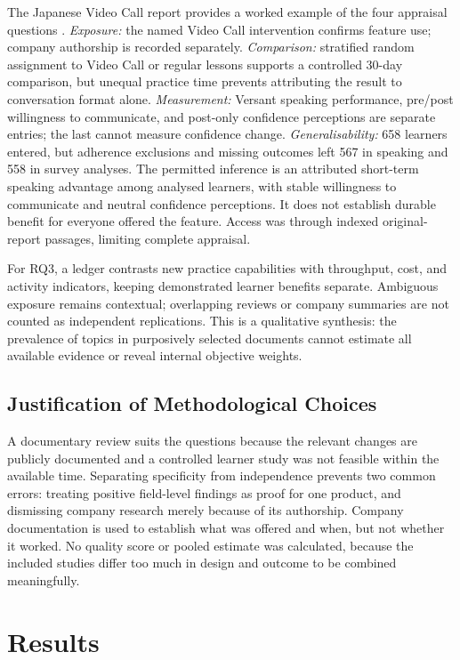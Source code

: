 \documentclass[11pt,titlepage]{article}
\begin{document}
The Japanese Video Call report provides a worked example of the four appraisal questions \parencite{kittredge2025video}. \emph{Exposure:} the named Video Call intervention confirms feature use; company authorship is recorded separately. \emph{Comparison:} stratified random assignment to Video Call or regular lessons supports a controlled 30-day comparison, but unequal practice time prevents attributing the result to conversation format alone. \emph{Measurement:} Versant speaking performance, pre/post willingness to communicate, and post-only confidence perceptions are separate entries; the last cannot measure confidence change. \emph{Generalisability:} 658 learners entered, but adherence exclusions and missing outcomes left 567 in speaking and 558 in survey analyses. The permitted inference is an attributed short-term speaking advantage among analysed learners, with stable willingness to communicate and neutral confidence perceptions. It does not establish durable benefit for everyone offered the feature. Access was through indexed original-report passages, limiting complete appraisal.

For RQ3, a ledger contrasts new practice capabilities with throughput, cost, and activity indicators, keeping demonstrated learner benefits separate. Ambiguous exposure remains contextual; overlapping reviews or company summaries are not counted as independent replications. This is a qualitative synthesis: the prevalence of topics in purposively selected documents cannot estimate all available evidence or reveal internal objective weights.

\subsection{Justification of Methodological Choices}
A documentary review suits the questions because the relevant changes are publicly documented and a controlled learner study was not feasible within the available time. Separating specificity from independence prevents two common errors: treating positive field-level findings as proof for one product, and dismissing company research merely because of its authorship. Company documentation is used to establish what was offered and when, but not whether it worked. No quality score or pooled estimate was calculated, because the included studies differ too much in design and outcome to be combined meaningfully.

\clearpage
\section{Results}
\label{sec:results}
\end{document}
